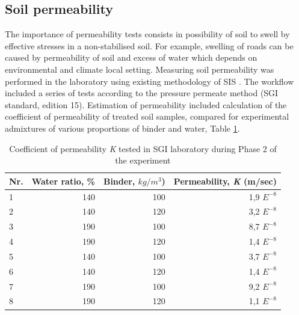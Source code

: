 \documentclass{amestyle}
\begin{document}
\subsection{Soil permeability}
The importance of permeability tests consists in possibility of soil to swell by effective stresses in a non-stabilised soil. For example, swelling of roads can be caused by permeability of soil and excess of water which depends on environmental and climate local setting. Measuring soil permeability was performed in the laboratory using existing methodology of SIS \cite{SIS2019}. The workflow included a series of tests according to the pressure permeate method (SGI standard, edition 15). Estimation of permeability included calculation of the coefficient of permeability of treated soil samples, compared for experimental admixtures of various proportions of binder and water, Table \ref{tab:1}.

\begin{table}[htbp]
  \caption{Coefficient of permeability \emph{K} tested in SGI laboratory during Phase 2 of the experiment}
  \label{tab:1}
  \centering
  \begin{tabular}{| l | r | r | r |}
    \hline
    \multicolumn{1}{|c|}{Nr.} &
    \multicolumn{1}{|c|}{Water ratio, \%} &
    \multicolumn{1}{|c|}{Binder, $kg/m^3$)} &
    \multicolumn{1}{|c|}{Permeability, \emph{K} (m/sec) } \\\hline
    1 & 140 & 100 & 1,9 $E^{-8}$ \\
    2 & 140 & 120 & 3,2 $E^{-8}$ \\
    3 & 190 & 100 & 8,7 $E^{-8}$ \\
    4 & 190 & 120 & 1,4 $E^{-8}$ \\
    5 & 140 & 100 & 3,7 $E^{-8}$ \\
    6 & 140 & 120 & 1,4 $E^{-8}$ \\
    7 & 190 & 100 & 9,2 $E^{-8}$ \\
    8 & 190 & 120 & 1,1 $E^{-8}$ \\\hline
  \end{tabular}
\end{table}
\end{document}
